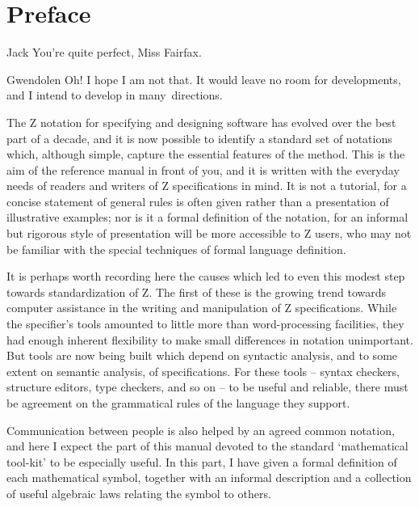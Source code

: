\tableofcontents		%

\clearpage\markboth{}{}\cleardoublepage
\chapter*{Preface}

\begin{thema}\begin{playlet}
\item[Jack] You're quite perfect, Miss Fairfax.
\item[Gwendolen] Oh! I hope I am not that. It would leave no room
	for developments, and I intend to develop in many~directions.
\end{playlet}\end{thema}

\noindent
The Z notation for specifying and designing software has evolved
over the best part of a decade, and it is now possible to identify
a standard set of notations which, although simple, capture the
essential features of the method. This is the aim of the reference
manual in front of you, and it is written with the everyday needs
of readers and writers of Z specifications in mind. It is not
a tutorial, for a concise statement of general rules
is often given rather than a presentation of illustrative examples;
nor is it a formal definition of the notation, for an informal
but rigorous style of presentation will be more accessible to
Z users, who may not be familiar with the special techniques of
formal language definition.

It is perhaps worth recording here the causes which led to even this
modest step towards standardization of Z. The first of these is the
growing trend towards computer assistance in the writing and
manipulation of Z specifications. While the specifier's tools
amounted to little more than word-processing facilities, they had
enough inherent flexibility to make small differences in notation
unimportant. But tools are now being built which depend on syntactic
analysis, and to some extent on semantic analysis, of specifications.
For these tools -- syntax checkers, structure editors, type checkers,
and so on -- to be useful and reliable, there must be agreement on
the grammatical rules of the language they support.

Communication between people is also helped by an agreed common
notation, and here I expect the part of this manual devoted to
the standard `mathematical tool-kit' to be especially useful. In
this part, I have given a formal definition of each mathematical
symbol, together with an informal description and a collection
of useful algebraic laws relating the symbol to others.

